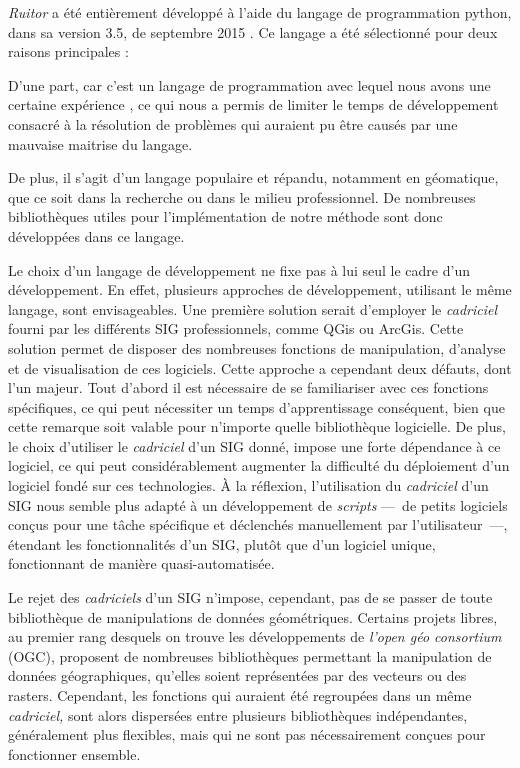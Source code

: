 \emph{Ruitor} a été entièrement développé à l'aide du langage de
programmation python, dans sa version 3.5, de septembre 2015
\autocite{VanRossum2009}. Ce langage a été sélectionné pour deux
raisons principales :
%
\begin{enumerate*}[label=(\arabic*)]
\item D'une part, car c'est un langage de programmation avec lequel
  nous avons une certaine expérience \autocite{Bunel2017b,Bunel2017c},
  ce qui nous a permis de limiter le temps de développement consacré à
  la résolution de problèmes qui auraient pu être causés par une
  mauvaise maitrise du langage.
\item De plus, il s'agit d'un langage populaire et répandu, notamment
  en géomatique, que ce soit dans la recherche ou dans le milieu
  professionnel. De nombreuses bibliothèques utiles pour
  l'implémentation de notre méthode sont donc développées dans ce
  langage.
\end{enumerate*}
%
Le choix d'un langage de développement ne fixe pas à lui seul le cadre
d'un développement. En effet, plusieurs approches de développement,
utilisant le même langage, sont envisageables. Une première solution
serait d'employer le \emph{cadriciel} fourni par les différents SIG
professionnels, comme QGis ou ArcGis. Cette solution permet de
disposer des nombreuses fonctions de manipulation, d'analyse et de
visualisation de ces logiciels. Cette approche a cependant deux
défauts, dont l'un majeur. Tout d'abord il est nécessaire de se
familiariser avec ces fonctions spécifiques, ce qui peut nécessiter un
temps d’apprentissage conséquent, bien que cette remarque soit valable
pour n'importe quelle bibliothèque logicielle. De plus, le choix
d'utiliser le \emph{cadriciel} d'un SIG donné, impose une forte
dépendance à ce logiciel, ce qui peut considérablement augmenter la
difficulté du déploiement d'un logiciel fondé sur ces technologies. À
la réflexion, l'utilisation du \emph{cadriciel} d'un SIG nous semble
plus adapté à un développement de \emph{scripts} ---~de petits
logiciels conçus pour une tâche spécifique et déclenchés manuellement
par l'utilisateur~---, étendant les fonctionnalités d'un SIG, plutôt
que d'un logiciel unique, fonctionnant de manière quasi-automatisée.

Le rejet des \emph{cadriciels} d'un SIG n'impose, cependant, pas de se
passer de toute bibliothèque de manipulations de données
géométriques. Certains projets libres, au premier rang desquels on
trouve les développements de \emph{l'open géo consortium} (OGC),
proposent de nombreuses bibliothèques permettant la manipulation de
données géographiques, qu'elles soient représentées par des vecteurs
ou des rasters. Cependant, les fonctions qui auraient été regroupées
dans un même \emph{cadriciel,} sont alors dispersées entre plusieurs
bibliothèques indépendantes, généralement plus flexibles, mais qui ne
sont pas nécessairement conçues pour fonctionner ensemble.

